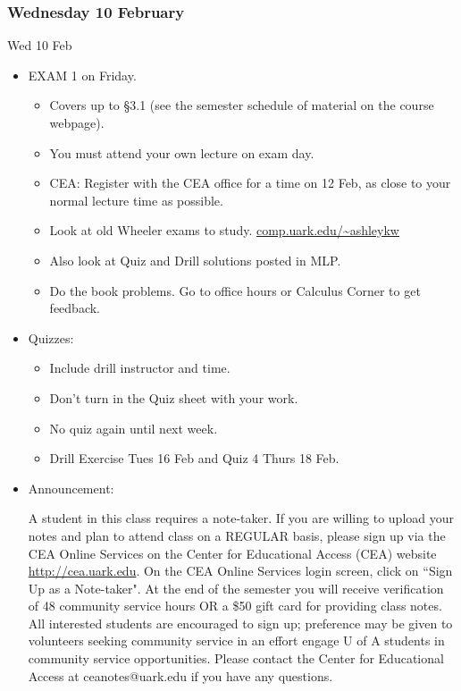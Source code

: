 \documentclass[cal1spr16Lectures.tex]{subfiles}
\begin{document}

\subsubsection{\bf Wednesday 10 February}
\begin{frame}[allowframebreaks]{Wed 10 Feb}
\begin{itemize}\footnotesize
\item EXAM 1 on Friday.  
\begin{itemize}\footnotesize
	\item Covers up to \S 3.1 (see the semester schedule of material on the course webpage). 
	\item \alert{You must attend your own lecture on exam day.}  
	\item CEA: Register with the CEA office for a time on 12 Feb, as close to your normal lecture time as possible.
	\item Look at old Wheeler exams to study.
	\url{comp.uark.edu/~ashleykw}
	\item Also look at Quiz and Drill solutions posted in MLP.
	\item Do the book problems.  Go to office hours or Calculus Corner to get feedback.
\end{itemize}	
\framebreak
\item Quizzes: 
\begin{itemize}\footnotesize
	\item Include drill instructor and time.
	\item Don't turn in the Quiz sheet with your work.
	\item No quiz again until next week.
	\item Drill Exercise Tues 16 Feb and Quiz 4 Thurs 18 Feb.
\end{itemize}
\framebreak
\item  Announcement: 

\alert{A student in this class requires a note-taker. If you are willing to upload your notes and plan to attend class on a REGULAR basis, please sign up via the CEA Online Services on the Center for Educational Access (CEA) website \url{http://cea.uark.edu}. On the CEA Online Services login screen, click on ``Sign Up as a Note-taker". At the end of the semester you will receive verification of 48 community service hours OR a \$50 gift card for providing class notes. All interested students are encouraged to sign up; preference may be given to volunteers seeking community service in an effort engage U of A students in community service opportunities. Please contact the Center for Educational Access at ceanotes@uark.edu if you have any questions.}

\end{itemize}
\end{frame}
\end{document}
